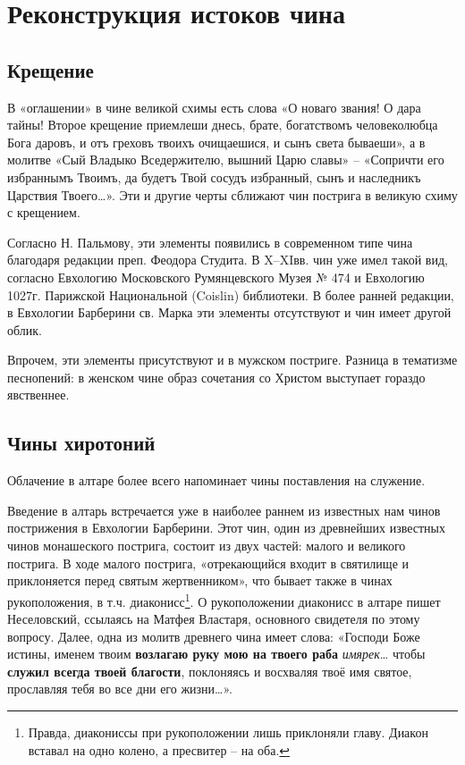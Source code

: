 \chapter{Реконструкция истоков чина}

\section*{Крещение}

В «оглашении» в чине великой схимы есть слова «О новаго звания! О дара тайны! Второе крещение приемлеши днесь, брате, богатствомъ человеколюбца Бога даровъ, и отъ греховъ твоихъ очищаешися, и сынъ света бываеши», а в молитве «Сый Владыко Вседержителю, вышний Царю славы» -- «Сопричти его избраннымъ Твоимъ, да будетъ Твой сосудъ избранный, сынъ и наследникъ Царствия Твоего\ldots{}».
Эти и другие черты сближают чин пострига в великую схиму с крещением.

Согласно Н. Пальмову\cite{palmov.postrijeniye.1914}, эти элементы появились в современном типе чина благодаря редакции преп. Феодора Студита.
В X--XIвв. чин уже имел такой вид, согласно Евхологию Московского Румянцевского Музея № 474 и Евхологию 1027г. Парижской Национальной (Coislin) библиотеки.
В более ранней редакции, в Евхологии Барберини св. Марка эти элементы отсутствуют и чин имеет другой облик.

Впрочем, эти элементы присутствуют и в мужском постриге.
Разница в тематизме песнопений: в женском чине образ сочетания со Христом выступает гораздо явственнее.

\section*{Чины хиротоний}\label{ux447ux438ux43dux44b-ux445ux438ux440ux43eux442ux43eux43dux438ux439}

Облачение в алтаре более всего напоминает чины поставления на служение.

Введение в алтарь встречается уже в наиболее раннем из известных нам чинов пострижения в Евхологии Барберини\cite[С.~210–216]{barberini.evhologiy.2011}.
Этот чин, один из древнейших известных чинов монашеского пострига, состоит из двух частей: малого и великого пострига.
В ходе малого пострига, «отрекающийся входит в святилище и приклоняется перед святым жертвенником», что бывает также в чинах рукоположения, в т.ч. диаконисс\footnote{Правда, диакониссы при рукоположении лишь приклоняли главу. Диакон вставал на одно колено, а пресвитер -- на оба.}.
О рукоположении диаконисс в алтаре пишет Неселовский\cite[С.~72]{neselovskiy.4ini.1906}, ссылаясь на Матфея Властаря, основного свидетеля по этому вопросу.
Далее, одна из молитв древнего чина имеет слова: «Господи Боже истины, именем твоим \textbf{возлагаю руку мою на твоего раба} \emph{имярек}\ldots{} чтобы \textbf{служил всегда твоей благости}, поклоняясь и восхваляя твоё имя святое, прославляя тебя во все дни его жизни\ldots{}».

